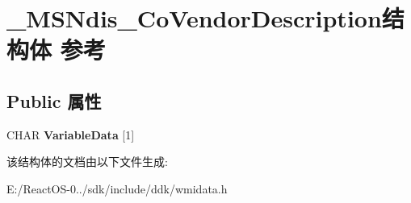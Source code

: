 \hypertarget{struct___m_s_ndis___co_vendor_description}{}\section{\+\_\+\+M\+S\+Ndis\+\_\+\+Co\+Vendor\+Description结构体 参考}
\label{struct___m_s_ndis___co_vendor_description}
\subsection*{Public 属性}
\begin{DoxyCompactItemize}
\item 
\mbox{\label{struct___m_s_ndis___co_vendor_description_ac38a433009b611725a88ff6b07a1a172}} 
C\+H\+AR {\bfseries Variable\+Data} \mbox{[}1\mbox{]}
\end{DoxyCompactItemize}


该结构体的文档由以下文件生成\+:\begin{DoxyCompactItemize}
\item 
E\+:/\+React\+O\+S-\/0../sdk/include/ddk/wmidata.\+h\end{DoxyCompactItemize}
